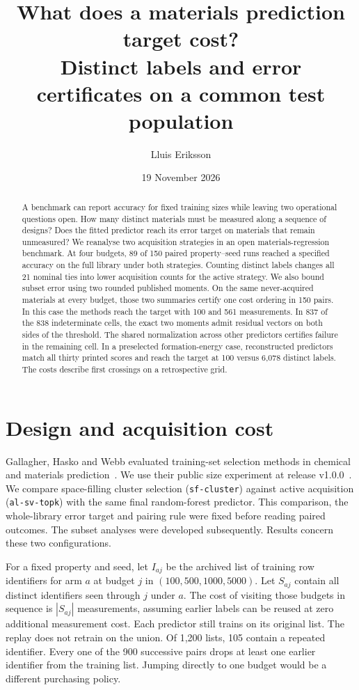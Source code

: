 \documentclass[11pt]{article}
\title{What does a materials prediction target cost?\\[3pt]\large Distinct labels and error certificates on a common test population}
\author{Lluis Eriksson}
\date{19 November 2026}
\begin{document}
\maketitle
\begin{abstract}
A benchmark can report accuracy for fixed training sizes while leaving two operational questions open. How many distinct materials must be measured along a sequence of designs? Does the fitted predictor reach its error target on materials that remain unmeasured? We reanalyse two acquisition strategies in an open materials-regression benchmark. At four budgets, 89 of 150 paired property--seed runs reached a specified accuracy on the full library under both strategies. Counting distinct labels changes all 21 nominal ties into lower acquisition counts for the active strategy. We also bound subset error using two rounded published moments. On the same never-acquired materials at every budget, those two summaries certify one cost ordering in 150 pairs. In this case the methods reach the target with 100 and 561 measurements. In 837 of the 838 indeterminate cells, the exact two moments admit residual vectors on both sides of the threshold. The shared normalization across other predictors certifies failure in the remaining cell. In a preselected formation-energy case, reconstructed predictors match all thirty printed scores and reach the target at 100 versus 6,078 distinct labels. The costs describe first crossings on a retrospective grid.
\end{abstract}

\section{Design and acquisition cost}
Gallagher, Hasko and Webb evaluated training-set selection methods in chemical and materials prediction~\cite{gallagher}. We use their public size experiment at release v1.0.0~\cite{dataset}. We compare space-filling cluster selection (\texttt{sf-cluster}) against active acquisition (\texttt{al-sv-topk}) with the same final random-forest predictor. This comparison, the whole-library error target and pairing rule were fixed before reading paired outcomes. The subset analyses were developed subsequently. Results concern these two configurations.

For a fixed property and seed, let $I_{aj}$ be the archived list of training row identifiers for arm $a$ at budget $j$ in $(100,500,1000,5000)$. Let $S_{aj}$ contain all distinct identifiers seen through $j$ under $a$. The cost of visiting those budgets in sequence is $|S_{aj}|$ measurements, assuming earlier labels can be reused at zero additional measurement cost. Each predictor still trains on its original list. The replay does not retrain on the union. Of 1,200 lists, 105 contain a repeated identifier. Every one of the 900 successive pairs drops at least one earlier identifier from the training list. Jumping directly to one budget would be a different purchasing policy.
\end{document}

